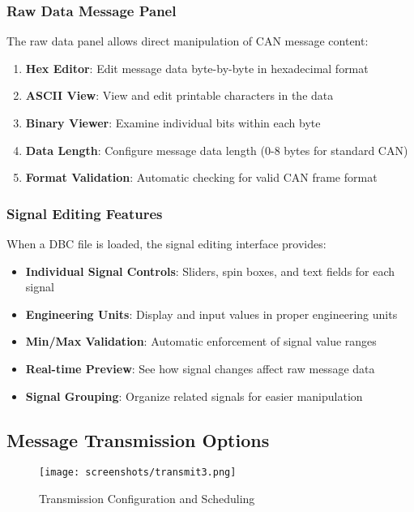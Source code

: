 \documentclass[11pt,a4paper]{article}
\begin{document}
\subsubsection{Raw Data Message Panel}

The raw data panel allows direct manipulation of CAN message content:

\begin{enumerate}
    \item \textbf{Hex Editor}: Edit message data byte-by-byte in hexadecimal format
    \item \textbf{ASCII View}: View and edit printable characters in the data
    \item \textbf{Binary Viewer}: Examine individual bits within each byte
    \item \textbf{Data Length}: Configure message data length (0-8 bytes for standard CAN)
    \item \textbf{Format Validation}: Automatic checking for valid CAN frame format
\end{enumerate}

\subsubsection{Signal Editing Features}

When a DBC file is loaded, the signal editing interface provides:

\begin{itemize}
    \item \textbf{Individual Signal Controls}: Sliders, spin boxes, and text fields for each signal
    \item \textbf{Engineering Units}: Display and input values in proper engineering units
    \item \textbf{Min/Max Validation}: Automatic enforcement of signal value ranges
    \item \textbf{Real-time Preview}: See how signal changes affect raw message data
    \item \textbf{Signal Grouping}: Organize related signals for easier manipulation
\end{itemize}

\subsection{Message Transmission Options}

\begin{figure}[H]
    \centering
    \texttt{[image: screenshots/transmit3.png]}
    \caption{Transmission Configuration and Scheduling}
    \label{fig:transmit3}
\end{figure}
\end{document}
